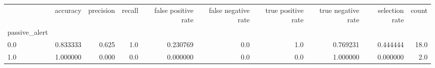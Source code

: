 \begin{tabular}{lrrrrrrrrr}
\toprule
{} &  accuracy &  precision &  recall &  false positive rate &  false negative rate &  true positive rate &  true negative rate &  selection rate &  count \\
passive\_alert &           &            &         &                      &                      &                     &                     &                 &        \\
\midrule
0.0           &  0.833333 &      0.625 &     1.0 &             0.230769 &                  0.0 &                 1.0 &            0.769231 &        0.444444 &   18.0 \\
1.0           &  1.000000 &      0.000 &     0.0 &             0.000000 &                  0.0 &                 0.0 &            1.000000 &        0.000000 &    2.0 \\
\bottomrule
\end{tabular}
